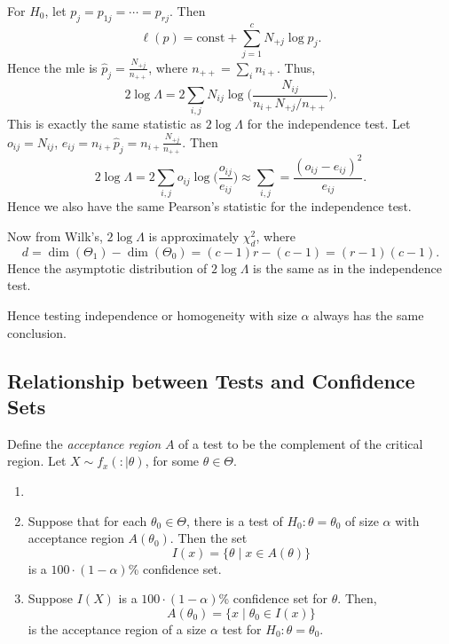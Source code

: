 \documentclass[12pt]{article}
\begin{document}
For $H_0$, let $p_j = p_{1j} = \cdots = p_{rj}$. Then
\[
	\ell(p) = \text{const} + \sum_{j=1}^{c} N_{+j}\log p_j.
\]
Hence the mle is $\hat p_{j} = \frac{N_{+j}}{n_{++}}$, where $n_{++} = \sum_i n_{i+}$. Thus,
\[
2\log \Lambda = 2 \sum_{i,j} N_{ij} \log \biggl( \frac{N_{ij}}{n_{i+} N_{+j}/n_{++}} \biggr).
\]
This is exactly the same statistic as $2 \log \Lambda$ for the independence test. Let $o_{ij} = N_{ij}$, $e_{ij} = n_{i+} \hat p_{j} = n_{i+} \frac{N_{+j}}{n_{++}}$. Then
\[
2 \log \Lambda = 2 \sum_{i,j} o_{ij} \log \biggl( \frac{o_{ij}}{e_{ij}} \biggr) \approx \sum_{i,j} =\frac{(o_{ij} - e_{ij})^2}{e_{ij}}.
\]
Hence we also have the same Pearson's statistic for the independence test.

Now from Wilk's, $2 \log \Lambda$ is approximately $\chi^2_d$, where
\[
d = \dim(\Theta_1) - \dim(\Theta_0) = (c-1)r - (c-1) = (r-1)(c-1).
\]
Hence the asymptotic distribution of $2 \log \Lambda$ is the same as in the independence test.

Hence testing independence or homogeneity with size $\alpha$ always has the same conclusion.

\subsection{Relationship between Tests and Confidence Sets}
\label{sub:relationship_between_tests_and_confidence_sets}

Define the \emph{acceptance region} $A$ of a test to be the complement of the critical region. Let $X \sim f_x(:\mid \theta)$, for some $\theta \in \Theta$.

\begin{theorem}
	\begin{enumerate}[\normalfont1.]
		\item[]
		\item Suppose that for each $\theta_0 \in \Theta$, there is a test of $H_0 : \theta = \theta_0$ of size $\alpha$ with acceptance region $A(\theta_0)$. Then the set
			\[
				I(x) = \{ \theta \mid x \in A(\theta)\}
			\]
			is a $100 \cdot (1-\alpha)$\% confidence set.
		\item Suppose $I(X)$ is a $100\cdot(1-\alpha)$\% confidence set for $\theta$. Then,
			\[
				A(\theta_0) = \{x \mid \theta_0 \in I(x)\}
			\]
			is the acceptance region of a size $\alpha$ test for $H_0 : \theta = \theta_0$.
	\end{enumerate}
\end{theorem}
\end{document}
